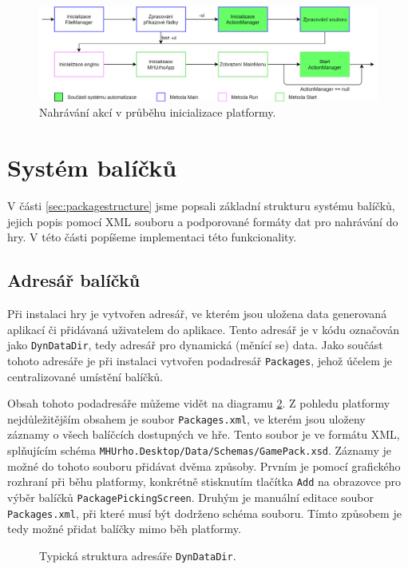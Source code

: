 \begin{figure}[h]
	\centering
	\includegraphics[width=\textwidth]{img/MenuActions.png}
	\caption{Nahrávání akcí v průběhu inicializace platformy.}
	\label{fig:uiautomationload}
\end{figure}

\section{Systém balíčků}
V části \ref{sec:packagestructure} jsme popsali základní strukturu systému balíčků, jejich popis pomocí XML souboru a podporované formáty dat pro nahrávání do hry. V této části popíšeme implementaci této funkcionality.

\subsection{Adresář balíčků}
\label{sec:packagedir}
Při instalaci hry je vytvořen adresář, ve kterém jsou uložena data generovaná aplikací či přidávaná uživatelem do aplikace. Tento adresář je v kódu označován jako \texttt{DynDataDir}, tedy adresář pro dynamická (měnící se) data. Jako součást tohoto adresáře je při instalaci vytvořen podadresář \texttt{Packages}, jehož účelem je centralizované umístění balíčků.

Obsah tohoto podadresáře můžeme vidět na diagramu \ref{fig:packagesdir}. Z pohledu platformy nejdůležitějším obsahem je soubor \texttt{Packages.xml}, ve kterém jsou uloženy záznamy o všech balíčcích dostupných ve hře. Tento soubor je ve formátu XML, splňujícím schéma \texttt{MHUrho.Desktop/Data/Schemas/GamePack.xsd}. Záznamy je možné do tohoto souboru přidávat dvěma způsoby. Prvním je pomocí grafického rozhraní při běhu platformy, konkrétně stisknutím tlačítka \texttt{Add} na obrazovce pro výběr balíčků \texttt{PackagePickingScreen}. Druhým je manuální editace soubor \texttt{Packages.xml}, při které musí být dodrženo schéma souboru. Tímto způsobem je tedy možné přidat balíčky mimo běh platformy. 

\begin{figure}[h]
	\centering
	\fontsize{6pt}{7pt}\selectfont
	\def\svgwidth{0.7\textwidth}
	
	\caption{Typická struktura adresáře \texttt{DynDataDir}.}
	\label{fig:packagesdir}
\end{figure}

